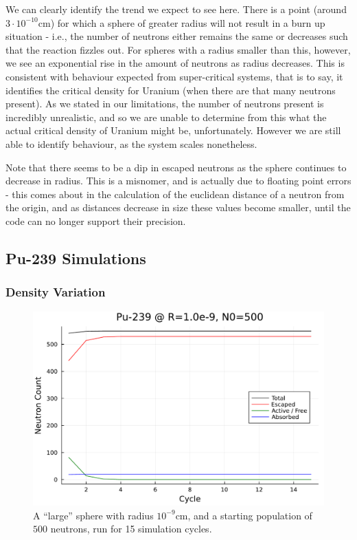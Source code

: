 We can clearly identify the trend we expect to see here. There is a point (around $3 \cdot 10^{-10} \text{cm}$) for which 
a sphere of greater radius will not result in a burn up situation - i.e., the number of neutrons either remains the same or 
decreases such that the reaction fizzles out. For spheres with a radius smaller than this, however, we see an exponential rise in the amount 
of neutrons as radius decreases. This is consistent with behaviour expected from super-critical systems, that is to say, 
it identifies the critical density for Uranium (when there are that many neutrons present). As we stated in our limitations, 
the number of neutrons present is incredibly unrealistic, and so we are unable to determine from this what the actual 
critical density of Uranium might be, unfortunately. However we are still able to identify behaviour, as the system scales nonetheless.

Note that there seems to be a dip in escaped neutrons as the sphere continues to decrease in radius. This is a misnomer, and 
is actually due to floating point errors - this comes about in the calculation of the euclidean distance of a neutron from 
the origin, and as distances decrease in size these values become smaller, until the code can no longer support their precision.

\subsection{Pu-239 Simulations}

\subsubsection{Density Variation}

\begin{figure}[h!]
    \centering
    \includegraphics[scale=0.7]{imgs/neutron-count-plutonium-large-sphere.pdf}
    \caption{A ``large'' sphere with radius $10^{-9}$cm, and a starting population of $500$ neutrons, run for 15 simulation 
    cycles.}
\end{figure}

